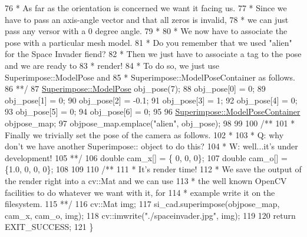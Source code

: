 \begin{DoxyCodeInclude}
76 \textcolor{comment}{     * As far as the orientation is concerned we want it facing us.}
77 \textcolor{comment}{     * Since we have to pass an axis-angle vector and that all zeros is invalid,}
78 \textcolor{comment}{     * we can just pass any versor with a 0 degree angle.}
79 \textcolor{comment}{     *}
80 \textcolor{comment}{     * We now have to associate the pose with a particular mesh model.}
81 \textcolor{comment}{     * Do you remember that we used "alien" for the Space Invader fiend?}
82 \textcolor{comment}{     * Then we just have to associate a tag to the pose and we are ready to}
83 \textcolor{comment}{     * render!}
84 \textcolor{comment}{     * To do so, we just use Superimpose::ModelPose and}
85 \textcolor{comment}{     * Superimpose::ModelPoseContainer as follows.}
86 \textcolor{comment}{     **/}
87     \mbox{\hyperlink{classSuperimpose_a85d40a5caf19f486d1e0c15c0a025378}{Superimpose::ModelPose}} obj\_pose(7);
88     obj\_pose[0] = 0;
89     obj\_pose[1] = 0;
90     obj\_pose[2] = -0.1;
91     obj\_pose[3] = 1;
92     obj\_pose[4] = 0;
93     obj\_pose[5] = 0;
94     obj\_pose[6] = 0;
95 
96     \mbox{\hyperlink{classSuperimpose_a178e3d4e2def6635bfcf9454dd4b5d22}{Superimpose::ModelPoseContainer}} objpose\_map;
97     objpose\_map.emplace(\textcolor{stringliteral}{"alien"}, obj\_pose);
98 
99 \textcolor{comment}{}
100 \textcolor{comment}{    /**}
101 \textcolor{comment}{     * Finally we trivially set the pose of the camera as follows.}
102 \textcolor{comment}{     *}
103 \textcolor{comment}{     * Q: why don't we have another Superimpose:: object to do this?}
104 \textcolor{comment}{     * W: well...it's under development!}
105 \textcolor{comment}{     **/}
106     \textcolor{keywordtype}{double} cam\_x[] = \{  0, 0, 0\};
107     \textcolor{keywordtype}{double} cam\_o[] = \{1.0, 0, 0, 0\};
108 
109 \textcolor{comment}{}
110 \textcolor{comment}{    /**}
111 \textcolor{comment}{     * It's render time!}
112 \textcolor{comment}{     * We save the output of the render right into a cv::Mat and we can use}
113 \textcolor{comment}{     * the well known OpenCV facilities to do whatever we want with it, for}
114 \textcolor{comment}{     * example write it on the filesystem.}
115 \textcolor{comment}{     **/}
116     cv::Mat img;
117     si\_cad.superimpose(objpose\_map, cam\_x, cam\_o, img);
118     cv::imwrite(\textcolor{stringliteral}{"./spaceinvader.jpg"}, img);
119 
120     \textcolor{keywordflow}{return} EXIT\_SUCCESS;
121 \}
\end{DoxyCodeInclude}


